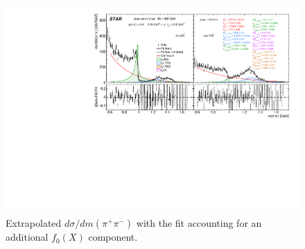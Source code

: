 \begin{figure}%
\centering
\includegraphics[width=\textwidth,page=1]{graphics/physicsResults/InvMassFit/EXTRA_RESONANCE/Ratio_PiPiInvMass_Fit.pdf}
%
\caption{Extrapolated $d\sigma/dm(\pi^{+}\pi^{-})$ with the fit accounting for an additional $f_{0}(X)$ component.}
\label{invMassFit_EXTRA_RESONANCE}
\end{figure}



%

